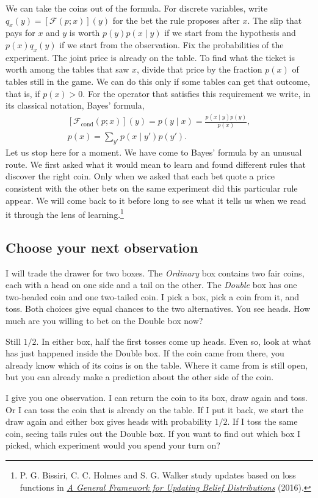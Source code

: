 \documentclass[12pt,oneside]{article}
\newcommand{\secao}[1]{\Needspace{5.2\baselineskip}\subsection*{#1}}
\newcommand{\bookanchor}[1]{\phantomsection\label{#1}}
\begin{document}
We\bookanchor{topic-01-3} can take the coins out of the formula. For discrete variables, write $q_x(y)=[\mathcal F(p;x)](y)$ for the bet the rule proposes after $x$. The slip that pays for $x$ and $y$ is worth $p(y)p(x\mid y)$ if we start from the hypothesis and $p(x)q_x(y)$ if we start from the observation. Fix the probabilities of the experiment. The joint price is already on the table. To find what the ticket is worth among the tables that saw $x$, divide that price by the fraction $p(x)$ of tables still in the game. We can do this only if some tables can get that outcome, that is, if $p(x)>0$. For the operator that satisfies this requirement we write, in its classical notation, Bayes' formula,
\[
 \begin{gathered}
 [\mathcal F_{\mathrm{cond}}(p;x)](y)=p(y\mid x)
 =\frac{p(x\mid y)p(y)}{p(x)},\\[4pt]
 p(x)=\sum_{y'}p(x\mid y')p(y').
 \end{gathered}
\]
Let us stop here for a moment. We have come to Bayes' formula by an unusual route. We first asked what it would mean to learn and found different rules that discover the right coin. Only when we asked that each bet quote a price consistent with the other bets on the same experiment did this particular rule appear. We will come back to it before long to see what it tells us when we read it through the lens of learning.\footnote{P. G. Bissiri, C. C. Holmes and S. G. Walker study updates based on loss functions in \href{https://doi.org/10.1111/rssb.12158}{\emph{A General Framework for Updating Belief Distributions}} (2016).}

\secao{Choose your next observation}
I will trade the drawer for two boxes. The \emph{Ordinary} box contains two fair coins, each with a head on one side and a tail on the other. The \emph{Double} box has one two-headed coin and one two-tailed coin. I pick a box, pick a coin from it, and toss. Both choices give equal chances to the two alternatives. You see heads. How much are you willing to bet on the Double box now?

Still \(1/2\). In either box, half the first tosses come up heads. Even so, look at what has just happened inside the Double box. If the coin came from there, you already know which of its coins is on the table. Where it came from is still open, but you can already make a prediction about the other side of the coin.

I give you one observation. I can return the coin to its box, draw again and toss. Or I can toss the coin that is already on the table. If I put it back, we start the draw again and either box gives heads with probability \(1/2\). If I toss the same coin, seeing tails rules out the Double box. If you want to find out which box I picked, which experiment would you spend your turn on?
\end{document}
